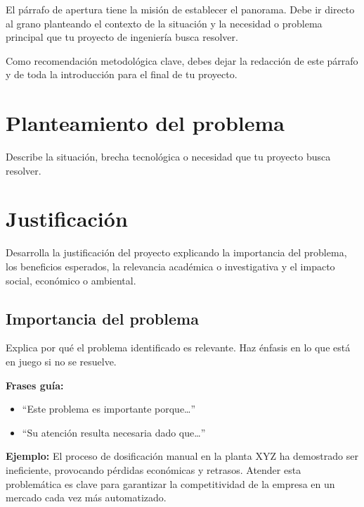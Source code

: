 \documentclass[12pt,letterpaper]{report}
\begin{document}
\begin{instrucciones}
El párrafo de apertura tiene la misión de establecer el panorama. Debe ir directo al grano planteando el contexto de la situación y la necesidad o problema principal que tu proyecto de ingeniería busca resolver.

Como recomendación metodológica clave, debes dejar la redacción de este párrafo y de toda la introducción para el final de tu proyecto.
\end{instrucciones}

\section{Planteamiento del problema}
\begin{instrucciones}
Describe la situación, brecha tecnológica o necesidad que tu proyecto busca resolver.
\end{instrucciones}

\section{Justificación}
\begin{instrucciones}
Desarrolla la justificación del proyecto explicando la importancia del problema, los beneficios esperados, la relevancia académica o investigativa y el impacto social, económico o ambiental.
\end{instrucciones}

\subsection{Importancia del problema}
\begin{instrucciones}
Explica por qué el problema identificado es relevante. Haz énfasis en lo que está en juego si no se resuelve.

\vspace{2mm}
\noindent \textbf{Frases guía:}
\begin{itemize}
  \item ``Este problema es importante porque\ldots''
  \item ``Su atención resulta necesaria dado que\ldots''
\end{itemize}

\noindent \textbf{Ejemplo:} El proceso de dosificación manual en la planta XYZ ha demostrado ser ineficiente, provocando pérdidas económicas y retrasos. Atender esta problemática es clave para garantizar la competitividad de la empresa en un mercado cada vez más automatizado.
\end{instrucciones}
\end{document}
